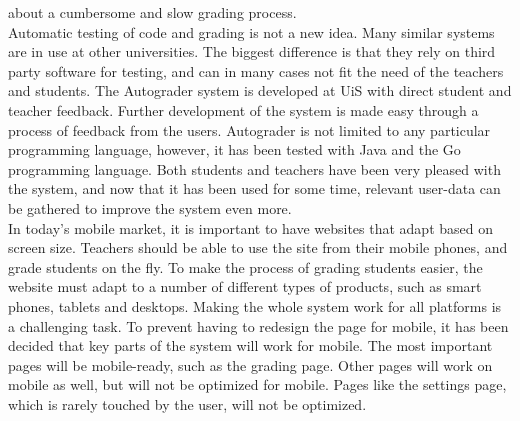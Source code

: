 about a cumbersome and slow grading process. \\Automatic testing of code and grading is not a new idea. Many similar systems are in use at other universities. The biggest difference is that they rely on third party software for testing, and can in many cases not fit the need of the teachers and students. The Autograder system is developed at UiS with direct student and teacher feedback. Further development of the system is made easy through a process of feedback from the users. Autograder is not limited to any particular programming language, however, it has been tested with Java and the Go programming language. Both students and teachers have been very pleased with the system, and now that it has been used for some time, relevant user-data can be gathered to improve the system even more. \\In today's mobile market, it is important to have websites that adapt based on screen size. Teachers should be able to use the site from their mobile phones, and grade students on the fly. To make the process of grading students easier, the website must adapt to a number of different types of products, such as smart phones, tablets and desktops. Making the whole system work for all platforms is a challenging task. To prevent having to redesign the page for mobile, it has been decided that key parts of the system will work for mobile. The most important pages will be mobile-ready, such as the grading page. Other pages will work on mobile as well, but will not be optimized for mobile. Pages like the settings page, which is rarely touched by the user, will not be optimized.

